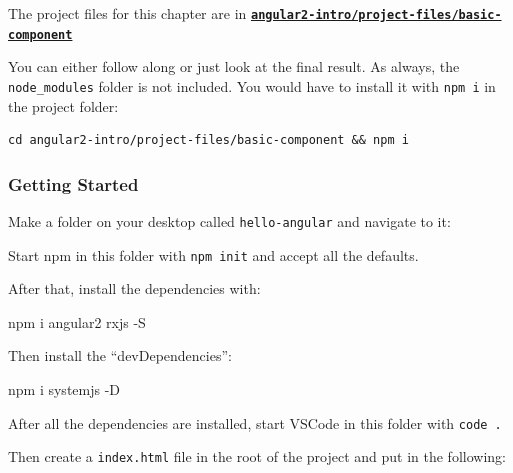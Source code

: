 \documentclass[12pt,]{article}
\newenvironment{Shaded}{}{}
\newcommand{\KeywordTok}[1]{\textcolor[rgb]{0.00,0.00,1.00}{{#1}}}
\newcommand{\OtherTok}[1]{\textcolor[rgb]{1.00,0.25,0.00}{{#1}}}
\newcommand{\NormalTok}[1]{{#1}}
\begin{document}
The project files for this chapter are in
\textbf{\href{https://github.com/st32lth/angular2-intro/tree/master/project-files/basic-component}{\texttt{angular2-intro/project-files/basic-component}}}

You can either follow along or just look at the final result. As always,
the \texttt{node\_modules} folder is not included. You would have to
install it with \texttt{npm\ i} in the project folder:

\begin{verbatim}
cd angular2-intro/project-files/basic-component && npm i
\end{verbatim}

\subsubsection{Getting Started}\label{getting-started}

Make a folder on your desktop called \texttt{hello-angular} and navigate
to it:

\begin{Shaded}
\end{Shaded}

Start npm in this folder with \texttt{npm\ init} and accept all the
defaults.

After that, install the dependencies with:

\begin{Shaded}
\begin{Highlighting}[numbers=left,,]
\KeywordTok{npm} \NormalTok{i angular2 rxjs -S}
\end{Highlighting}
\end{Shaded}

Then install the ``devDependencies'':

\begin{Shaded}
\begin{Highlighting}[numbers=left,,]
\KeywordTok{npm} \NormalTok{i systemjs -D}
\end{Highlighting}
\end{Shaded}

After all the dependencies are installed, start VSCode in this folder
with \texttt{code\ .}

Then create a \texttt{index.html} file in the root of the project and
put in the following:
\end{document}
